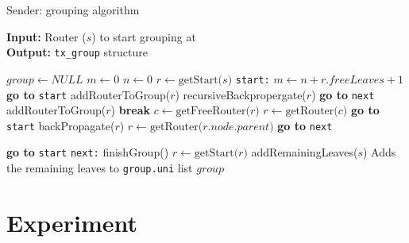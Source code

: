 \begin{algorithm}
    \caption{Sender: grouping algorithm}\label{alg:sender_grouping}
    \hspace*{\algorithmicindent} \textbf{Input:} Router ($s$) to start grouping at\\
    \hspace*{\algorithmicindent} \textbf{Output:} \texttt{tx\_group} structure\\
\begin{algorithmic}[1]
\State $group\gets NULL$
\State $m\gets 0$
\State $n\gets 0$
\State $r\gets \text{getStart($s$)}$
\Label \texttt{start:}
        \State $m\gets n + r.freeLeaves + 1$
            \State \textbf{go to} \texttt{start}
            \State addRouterToGroup($r$)
            \State recursiveBackpropergate($r$)
            \State \textbf{go to} \texttt{next}
            \State addRouterToGroup($r$)
            \State \textbf{break}
        \EndIf
    \EndWhile
        \State $c\gets \text{getFreeRouter($r$)}$
            \State $r\gets \text{getRouter($c$)}$
            \State \textbf{go to} \texttt{start}
        \EndIf
    \EndWhile
        \State backPropagate($r$)
        \State $r\gets \text{getRouter($r.node.parent$)}$
            \State \textbf{go to} \texttt{next}
        \EndIf

        \State \textbf{go to} \texttt{start}
    \EndIf
\Label \texttt{next:}
    \State finishGroup()
    \State $r\gets \text{getStart($r$)}$
\EndWhile
    \State addRemainingLeaves($s$)
    \Comment Adds the remaining leaves to \texttt{group.uni} list 
    \State \Return $group$
\end{algorithmic}
\end{algorithm}


\section{Experiment} %
\label{sec:Experiment}

